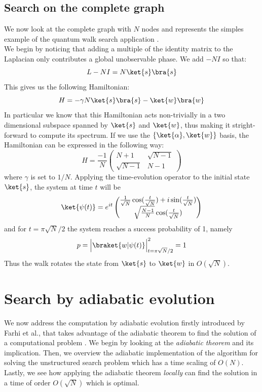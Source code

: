 \subsection{Search on the complete graph}\label{subsec:search qw complete graph}
We now look at the complete graph with $N$ nodes and represents the simples example of the quantum walk search application \cite{Childs2004}. \\We begin by noticing that adding a multiple of the identity matrix to the Laplacian only contributes a global unobservable phase. We add $-NI$ so that:
\begin{equation}
  L - NI = N\ket{s}\bra{s}
\end{equation}
This gives us the following Hamiltonian:
\begin{equation}
  H = -\gamma N\ket{s}\bra{s} - \ket{w}\bra{w}
\end{equation}
In particular we know that this Hamiltonian acts non-trivially in a two dimensional subspace spanned by $\ket{s}$ and $\ket{w}$, thus making it stright-forward to compute its spectrum. If we use the $\{\ket{\alpha}, \ket{w}\}$ basis, the Hamiltonian can be expressed in the following way:
\begin{equation}
  H = \frac{-1}{N} \begin{pmatrix} N+1 & \sqrt{N-1}\\ \sqrt{N-1} & N-1 \end{pmatrix}
\end{equation}
where $\gamma$ is set to $1/N$.
Applying the time-evolution operator to the initial state $\ket{s}$, the system at time $t$ will be
\begin{equation}
  \ket{\psi(t)} = e^{it}
  \begin{pmatrix}
  \frac{1}{\sqrt{N}}\cos(\frac{t}{\sqrt{N}}) +i\sin(\frac{t}{\sqrt{N}})\\
  \sqrt{\frac{N-1}{N}}\cos(\frac{t}{\sqrt{N}})
  \end{pmatrix}
  \label{eq:qw_state}
\end{equation}
and for $t=\pi\sqrt{N}/2$ the system reaches a success probability of 1, namely
\begin{equation}
  p = \Big|\braket{w|\psi(t)}\Big|^2_{t=\pi\sqrt{N}/2} = 1
\end{equation}
Thus the walk rotates the state from $\ket{s}$ to $\ket{w}$ in $O(\sqrt{N})$.

\section{Search by adiabatic evolution}\label{sec:adiabatic evolution}
We now address the computation by adiabatic evolution firstly introduced by Farhi et al., that takes advantage of the adiabatic theorem to find the solution of a computational problem \cite{Farhi2000}. We begin by looking at the \textit{adiabatic theorem} and its implication. Then, we overview the adiabatic implementation of the algorithm for solving the unstructured search problem which has a time scaling of $O(N)$. Lastly, we see how applying the adiabatic theorem \textit{locally} can find the solution in a time of order $O(\sqrt{N})$ which is optimal.

